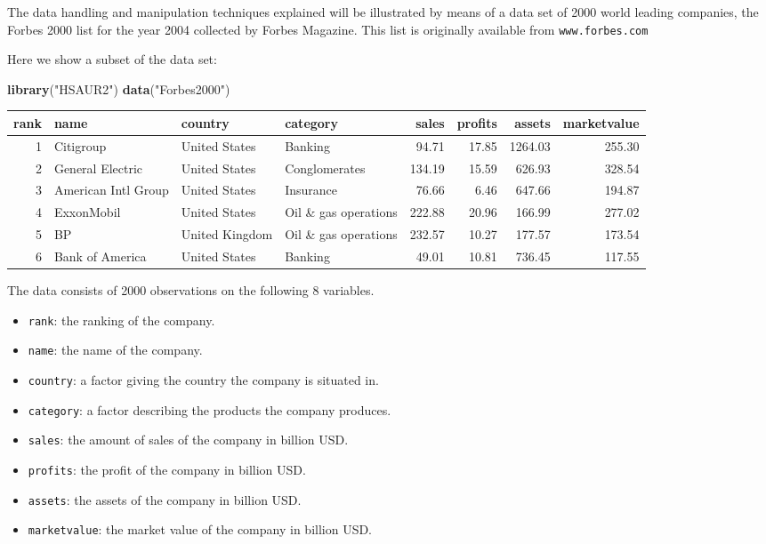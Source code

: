 \documentclass[]{article}
\def\tightlist{}
\newenvironment{Shaded}{\begin{snugshade}}{\end{snugshade}}
\newcommand{\KeywordTok}[1]{\textcolor[rgb]{0.13,0.29,0.53}{\textbf{{#1}}}}
\newcommand{\StringTok}[1]{\textcolor[rgb]{0.31,0.60,0.02}{{#1}}}
\newcommand{\NormalTok}[1]{{#1}}
\numberwithin{equation}{section}
\begin{document}
The data handling and manipulation techniques explained will be
illustrated by means of a data set of 2000 world leading companies, the
Forbes 2000 list for the year 2004 collected by Forbes Magazine. This
list is originally available from \texttt{www.forbes.com}

Here we show a subset of the data set:

\begin{Shaded}
\begin{Highlighting}[]
\KeywordTok{library}\NormalTok{(}\StringTok{"HSAUR2"}\NormalTok{)}
\KeywordTok{data}\NormalTok{(}\StringTok{"Forbes2000"}\NormalTok{)}
\end{Highlighting}
\end{Shaded}

\begin{longtable}[]{@{}rlllrrrr@{}}
\toprule
rank & name & country & category & sales & profits & assets &
marketvalue\tabularnewline
\midrule
\endhead
1 & Citigroup & United States & Banking & 94.71 & 17.85 & 1264.03 &
255.30\tabularnewline
2 & General Electric & United States & Conglomerates & 134.19 & 15.59 &
626.93 & 328.54\tabularnewline
3 & American Intl Group & United States & Insurance & 76.66 & 6.46 &
647.66 & 194.87\tabularnewline
4 & ExxonMobil & United States & Oil \& gas operations & 222.88 & 20.96
& 166.99 & 277.02\tabularnewline
5 & BP & United Kingdom & Oil \& gas operations & 232.57 & 10.27 &
177.57 & 173.54\tabularnewline
6 & Bank of America & United States & Banking & 49.01 & 10.81 & 736.45 &
117.55\tabularnewline
\bottomrule
\end{longtable}

The data consists of 2000 observations on the following 8 variables.

\begin{itemize}
\tightlist
\item
  \texttt{rank}: the ranking of the company.
\item
  \texttt{name}: the name of the company.
\item
  \texttt{country}: a factor giving the country the company is situated
  in.
\item
  \texttt{category}: a factor describing the products the company
  produces.
\item
  \texttt{sales}: the amount of sales of the company in billion USD.
\item
  \texttt{profits}: the profit of the company in billion USD.
\item
  \texttt{assets}: the assets of the company in billion USD.
\item
  \texttt{marketvalue}: the market value of the company in billion USD.
\end{itemize}
\end{document}
